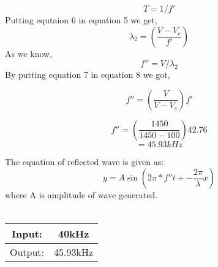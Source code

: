 \documentclass[journal,12pt,twocolumn]{IEEEtran}
\theoremstyle{remark}
\begin{document}
\begin{equation}
T=1/f'
\end{equation}
Putting equtaion 6 in equation 5 we get,
\begin{equation}
\lambda_2=(\frac{V-V_e}{f'})
\end{equation}
As we know,
\begin{equation}
f''=V/\lambda_2
\end{equation}
By putting equation 7 in equation 8 we got,

\begin{equation}
f''=(\frac{V}{V-V_e})f'
\end{equation}

$$f''=(\frac{1450}{1450-100})42.76$$
$$=45.93kHz$$

The equation of reflected wave is given as:
\begin{equation}
y=A\sin(2\pi*f''t+-\frac{2\pi}{\lambda}x)
\end{equation}
where A is amplitude of wave generated.
\\
\\

\begin{tabular}{|c|c|}
   \hline
   Input: & 40kHz\\
   \hline
   Output: & 45.93kHz\\
   \hline
\end{tabular}
\end{document}
